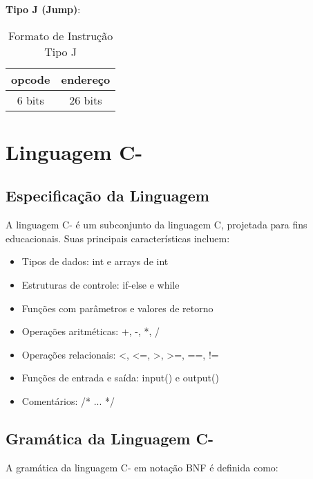 \documentclass[
	12pt,				%
	oneside,
	a4paper,			%
	english,			%
	french,				%
	spanish,			%
	brazil,				%
	]{abntex2}
\begin{document}
\textbf{Tipo J (Jump)}:
\begin{table}[H]
\centering
\caption{Formato de Instrução Tipo J}
\begin{tabular}{|c|c|}
\hline
opcode & endereço \\
\hline
6 bits & 26 bits \\
\hline
\end{tabular}
\end{table}

\section{Linguagem C-}

\subsection{Especificação da Linguagem}
A linguagem C- é um subconjunto da linguagem C, projetada para fins educacionais. Suas principais características incluem:

\begin{itemize}
    \item Tipos de dados: int e arrays de int
    \item Estruturas de controle: if-else e while
    \item Funções com parâmetros e valores de retorno
    \item Operações aritméticas: +, -, *, /
    \item Operações relacionais: <, <=, >, >=, ==, !=
    \item Funções de entrada e saída: input() e output()
    \item Comentários: /* ... */
\end{itemize}

\subsection{Gramática da Linguagem C-}
A gramática da linguagem C- em notação BNF é definida como:
\end{document}
